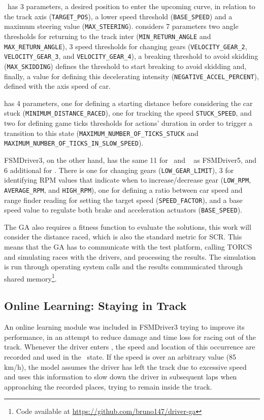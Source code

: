 \AC~has 3 parameters, a desired position to enter the upcoming curve, in relation to the track axis (\texttt{TARGET\_POS}), a lower speed threshold (\texttt{BASE\_SPEED}) and a maximum steering value (\texttt{MAX\_STEERING}). \OT considers 7 parameters two angle thresholds for returning to the track inter (\texttt{MIN\_RETURN\_ANGLE} and \texttt{MAX\_RETURN\_ANGLE}), 3 speed thresholds for changing gears (\texttt{VELOCITY\_GEAR\_2}, \texttt{VELOCITY\_GEAR\_3}, and \texttt{VELOCITY\_GEAR\_4}), a breaking threshold to avoid skidding (\texttt{MAX\_SKIDDING}) defines the threshold to start breaking to avoid skidding and, finally, a value for defining this decelerating intensity (\texttt{NEGATIVE\_ACCEL\_PERCENT}), defined with the axis speed of car.

\St has 4 parameters, one for defining a starting distance before considering the car stuck (\texttt{MINIMUM\_DISTANCE\_RACED}), one for tracking the speed \texttt{STUCK\_SPEED}, and two for defining game ticks thresholds for actions' duration in order to trigger a transition to this state (\texttt{MAXIMUM\_NUMBER\_OF\_TICKS\_STUCK} and \texttt{MAXIMUM\_NUMBER\_OF\_TICKS\_IN\_SLOW\_SPEED}).

FSMDriver3, on the other hand, has the same 11 for \OT~and \St~ as FSMDriver5, and 6 additional for \IT. There is one for changing gears (\texttt{LOW\_GEAR\_LIMIT}), 3 for identifying RPM values that indicate when to increase/decrease gear (\texttt{LOW\_RPM}, \texttt{AVERAGE\_RPM}, and \texttt{HIGH\_RPM}), one for defining a ratio between car speed and range finder reading for setting the target speed (\texttt{SPEED\_FACTOR}), and a base speed value to regulate both brake and acceleration actuators (\texttt{BASE\_SPEED}).

The GA also requires a fitness function to evaluate the solutions, this work will consider the distance raced, which is also the standard metric for SCR. This means that the GA has to communicate with the test platform, calling  TORCS and simulating races with the drivers, and processing the results. The simulation is run through operating system calls and the results communicated through shared memory\footnote{Code available at \url{https://github.com/bruno147/driver-ga}}.

\subsection{Online Learning: Staying in Track}%
An online learning module was included in FSMDriver3 trying to improve its performance, in an attempt to reduce damage and time loss for racing out of the track. Whenever the driver enters \OT, the speed and location of this occurrence are recorded and used in the \racing~state. If the speed is over an arbitrary value (85 km/h), the model assumes the driver has left the track due to excessive speed and uses this information to slow down the driver in subsequent laps when approaching the recorded places, trying to remain inside the track.

